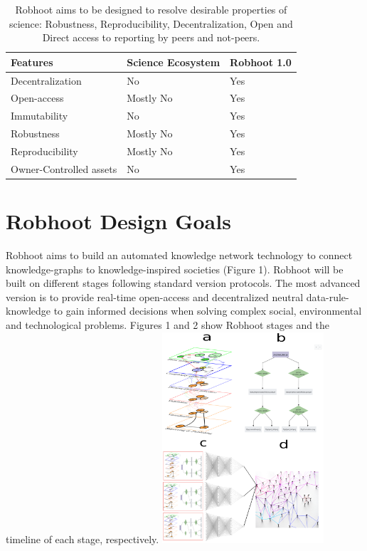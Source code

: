 \documentclass[10pt, a4paper, twocolumn]{article} %
\begin{document}
\begin{table}
\begin{tabular}{ p{3cm} | p{2cm} | p{2cm}}
  \hline \hline
  \textbf{Features} & \textbf{Science Ecosystem} &\textbf{Robhoot 1.0}\\  \hline
  Decentralization & No & Yes \\ \hline
  Open-access & Mostly No & Yes \\ \hline
  Immutability & No & Yes \\ \hline
  Robustness & Mostly No & Yes \\ \hline
  Reproducibility & Mostly No & Yes \\ \hline        
  Owner-Controlled assets & No & Yes \\ \hline       
  \bottomrule

\end{tabular}
\caption{Robhoot aims to be designed to resolve desirable properties
  of science: Robustness, Reproducibility, Decentralization, Open and
  Direct access to reporting by peers and not-peers.}
\end{table}
  \section{Robhoot Design Goals}
  Robhoot aims to build an automated knowledge network technology to
  connect knowledge-graphs to knowledge-inspired societies (Figure
  1). Robhoot will be built on different stages following standard
  version protocols. The most advanced version is to provide real-time
  open-access and decentralized neutral data-rule-knowledge to gain
  informed decisions when solving complex social, environmental and
  technological problems. Figures 1 and 2 show Robhoot stages and the
  timeline of each stage, respectively.
  \includegraphics[width=0.45\textwidth]{Figure1.pdf}
  
\end{document}
